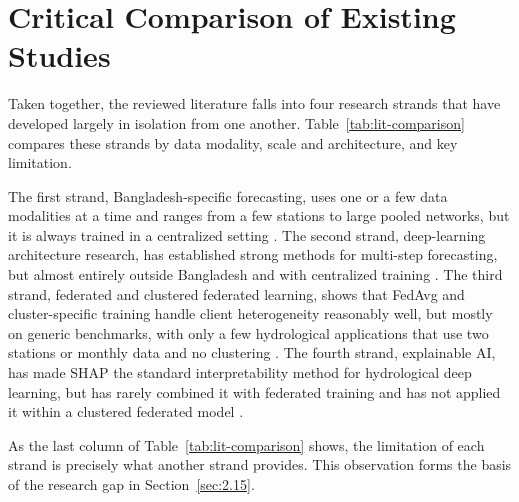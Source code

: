 \section{Critical Comparison of Existing Studies}
\label{sec:2.14}

Taken together, the reviewed literature falls into four research strands that
have developed largely in isolation from one another.
Table~\ref{tab:lit-comparison} compares these strands by data modality, scale
and architecture, and key limitation.

The first strand, Bangladesh-specific forecasting, uses one or a few data
modalities at a time and ranges from a few stations to large pooled networks, but it is always
trained in a centralized setting
\cite{Islam2026a,Islam2026b,Ruma2023,Rakin2023,Rajab2023,HemelSakib2024,Hossain2025}.
The second strand, deep-learning architecture research, has established strong
methods for multi-step forecasting, but almost entirely outside Bangladesh and
with centralized training
\cite{Kao2020,Cui2022,Lim2025,Yuan2023,Ni2024,Kumar2023,Hameed2025,Waqas2024,Aghenda2025,Li2024,Lin2021,Li2025}.
The third strand, federated and clustered federated learning, shows that FedAvg
and cluster-specific training handle client heterogeneity reasonably well, but
mostly on generic benchmarks, with only a few hydrological applications that
use two stations or monthly data and no clustering
\cite{McMahan2017,Zhu2021,Chen2025,Ghosh2021,Harshvardhan2022,BenAli2026,Amanzholova2026,Mahir2025}.
The fourth strand, explainable AI, has made SHAP the standard interpretability
method for hydrological deep learning, but has rarely combined it with
federated training and has not applied it within a clustered federated model
\cite{Lundberg2017,Huang2024,Khorrami2025,Parasar2025,Mahir2025}.

As the last column of Table~\ref{tab:lit-comparison} shows, the limitation of
each strand is precisely what another strand provides. This observation forms
the basis of the research gap in Section~\ref{sec:2.15}.

